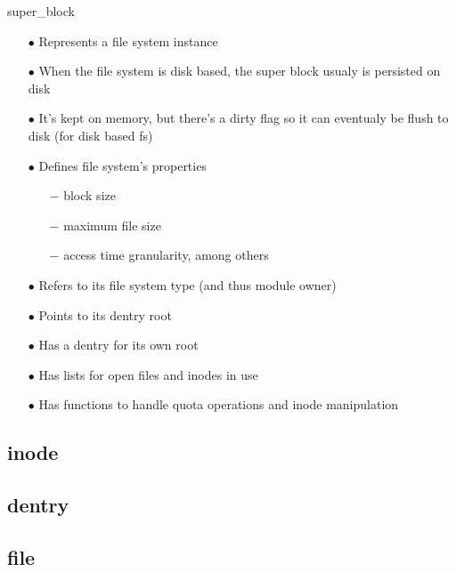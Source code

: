 \documentclass{beamer}
\begin{document}
\begin{frame}{super\_block}
	
	\begin{itemize}[<+->]

		\item[$\bullet$]{Represents a file system instance}
		\item[$\bullet$]{When the file system is disk based, the super block usualy is persisted on disk}		
		\item[$\bullet$]{It's kept on memory, but there's a dirty flag so it can eventualy be flush to disk (for disk based fs)}
		\item[$\bullet$]{Defines file system's properties}
			\begin{itemize}
				\item[$-$]{block size}
				\item[$-$]{maximum file size}
				\item[$-$]{access time granularity, among others}
			\end{itemize}	
		
		\item[$\bullet$]{Refers to its file system type (and thus module owner)}
		\item[$\bullet$]{Points to its dentry root}
		\item[$\bullet$]{Has a dentry for its own root}
		\item[$\bullet$]{Has lists for open files and inodes in use}
		\item[$\bullet$]{Has functions to handle quota operations and inode manipulation}
		
	\end{itemize}

\end{frame}

\subsection{inode}

\subsection{dentry}

\subsection{file}

\end{document}
